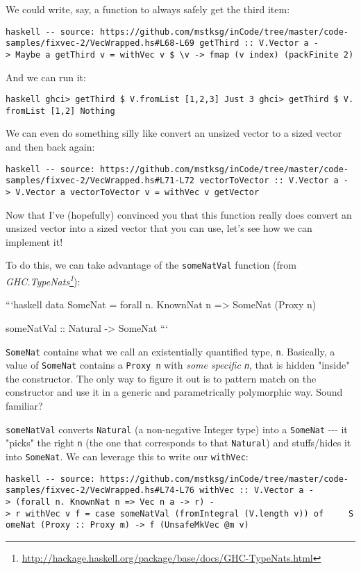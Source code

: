 \documentclass[]{article}
\renewcommand{\href}[2]{#2\footnote{\url{#1}}}
\begin{document}
We could write, say, a function to always safely get the third item:

\texttt{haskell\ -\/-\ source:\ https://github.com/mstksg/inCode/tree/master/code-samples/fixvec-2/VecWrapped.hs\#L68-L69\ getThird\ ::\ V.Vector\ a\ -\textgreater{}\ Maybe\ a\ getThird\ v\ =\ withVec\ v\ \$\ \textbackslash{}v\textquotesingle{}\ -\textgreater{}\ fmap\ (v\textquotesingle{}\ \textasciigrave{}index\textasciigrave{})\ (packFinite\ 2)}

And we can run it:

\texttt{haskell\ ghci\textgreater{}\ getThird\ \$\ V.fromList\ {[}1,2,3{]}\ Just\ 3\ ghci\textgreater{}\ getThird\ \$\ V.fromList\ {[}1,2{]}\ Nothing}

We can even do something silly like convert an unsized vector to a sized vector
and then back again:

\texttt{haskell\ -\/-\ source:\ https://github.com/mstksg/inCode/tree/master/code-samples/fixvec-2/VecWrapped.hs\#L71-L72\ vectorToVector\ ::\ V.Vector\ a\ -\textgreater{}\ V.Vector\ a\ vectorToVector\ v\ =\ withVec\ v\ getVector}

Now that I've (hopefully) convinced you that this function really does convert
an unsized vector into a sized vector that you can use, let's see how we can
implement it!

To do this, we can take advantage of the \texttt{someNatVal} function (from
\emph{\href{http://hackage.haskell.org/package/base/docs/GHC-TypeNats.html}{GHC.TypeNats}}):

```haskell data SomeNat = forall n. KnownNat n =\textgreater{} SomeNat (Proxy n)

someNatVal :: Natural -\textgreater{} SomeNat ```

\texttt{SomeNat} contains what we call an existentially quantified type,
\texttt{n}. Basically, a value of \texttt{SomeNat} contains a \texttt{Proxy\ n}
with \emph{some specific \texttt{n}}, that is hidden "inside" the constructor.
The only way to figure it out is to pattern match on the constructor and use it
in a generic and parametrically polymorphic way. Sound familiar?

\texttt{someNatVal} converts \texttt{Natural} (a non-negative Integer type) into
a \texttt{SomeNat} -\/-\/- it "picks" the right \texttt{n} (the one that
corresponds to that \texttt{Natural}) and stuffs/hides it into \texttt{SomeNat}.
We can leverage this to write our \texttt{withVec}:

\texttt{haskell\ -\/-\ source:\ https://github.com/mstksg/inCode/tree/master/code-samples/fixvec-2/VecWrapped.hs\#L74-L76\ withVec\ ::\ V.Vector\ a\ -\textgreater{}\ (forall\ n.\ KnownNat\ n\ =\textgreater{}\ Vec\ n\ a\ -\textgreater{}\ r)\ -\textgreater{}\ r\ withVec\ v\ f\ =\ case\ someNatVal\ (fromIntegral\ (V.length\ v))\ of\ \ \ \ \ SomeNat\ (Proxy\ ::\ Proxy\ m)\ -\textgreater{}\ f\ (UnsafeMkVec\ @m\ v)}
\end{document}
